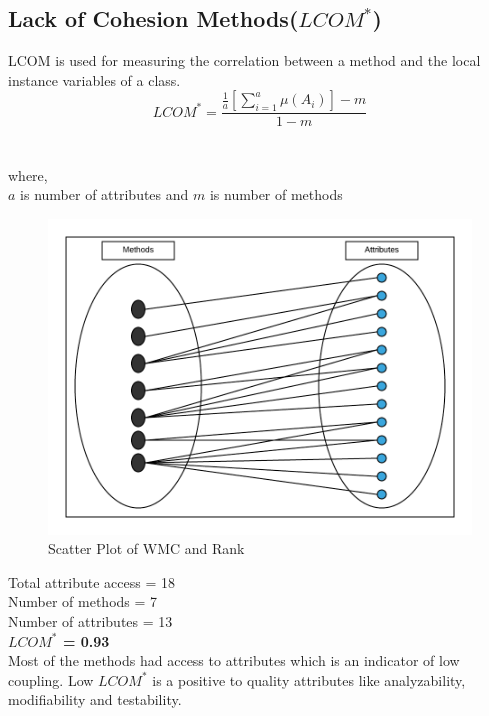 \documentclass[a4paper, 11pt]{article}
\begin{document}
\subsection{Lack of Cohesion Methods($LCOM^{*}$)}
LCOM is used for measuring the correlation between a method and the local instance variables of a class.
\begin{equation*}
     LCOM^* = \frac{\frac{1}{a}[\sum_{i=1}^{a}\mu(A_i)]-m}{1-m}
 \end{equation*}\\ \\ 
 where,\\
 $a$ is number of attributes and $m$ is number of methods\\
\begin{figure}[!hbt]
		\begin{center}
		\includegraphics[width=\columnwidth]{Blank_Diagram__1_.png}
		\caption{Scatter Plot of WMC and Rank}
		\label{fig:figure}
		\end{center}
	\end{figure}
Total attribute access = 18\\
Number of methods = 7\\
Number of attributes = 13\\
\textbf{$LCOM^*$ = 0.93} \\
Most of the methods had access to attributes which is an indicator of low coupling. Low $LCOM^*$ is a positive to quality attributes like analyzability, modifiability and testability. \\
\end{document}
